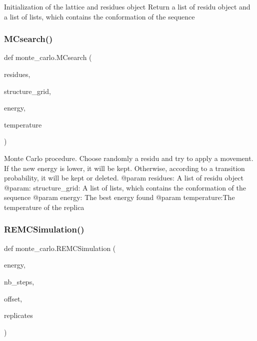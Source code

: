 \begin{DoxyVerb}Initialization of the lattice and residues object
    Return a list of residu object and a list of lists, which contains the
conformation of the sequence
\end{DoxyVerb}
 \mbox{\label{namespacemonte__carlo_ab45e8ac7cea8ce87124301b1b3f91141}} 
\subsubsection{\texorpdfstring{M\+Csearch()}{MCsearch()}}
{\footnotesize\ttfamily def monte\+\_\+carlo.\+M\+Csearch (\begin{DoxyParamCaption}\item[{}]{residues,  }\item[{}]{structure\+\_\+grid,  }\item[{}]{energy,  }\item[{}]{temperature }\end{DoxyParamCaption})}

\begin{DoxyVerb}Monte Carlo procedure. Choose randomly a residu and try to
apply a movement. If the new energy is lower, it will be kept.
Otherwise, according to a transition probability, it will be kept or
deleted.
    @param residues: A list of residu object
    @param: structure_grid: A list of lists, which contains the
                           conformation of the sequence
    @param energy: The best energy found
    @param temperature:The temperature of the replica
\end{DoxyVerb}
 \mbox{\label{namespacemonte__carlo_aac5828919d486ac10d193d512f64f42c}} 
\subsubsection{\texorpdfstring{R\+E\+M\+C\+Simulation()}{REMCSimulation()}}
{\footnotesize\ttfamily def monte\+\_\+carlo.\+R\+E\+M\+C\+Simulation (\begin{DoxyParamCaption}\item[{}]{energy,  }\item[{}]{nb\+\_\+steps,  }\item[{}]{offset,  }\item[{}]{replicates }\end{DoxyParamCaption})}

